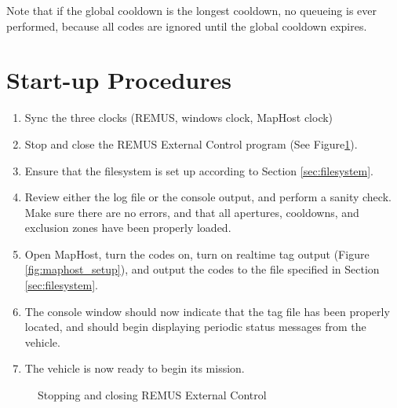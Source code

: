 \documentclass[11pt]{article} %
\begin{document}
Note that if the global cooldown is the longest cooldown, no queueing is ever performed, because all codes are ignored until the global cooldown
expires.


\section{Start-up Procedures}
\label{sec:startup}
\begin{enumerate}
\item Sync the three clocks (REMUS, windows clock, MapHost clock)
\item Stop and close the REMUS External Control program (See Figure\ref{fig:ext_control}).
\item Ensure that the filesystem is set up according to Section \ref{sec:filesystem}.
\item Review either the log file or the console output, and perform a sanity check. Make sure there are no errors, and that all apertures, cooldowns, and exclusion zones have been properly loaded.
\item Open MapHost, turn the codes on, turn on realtime tag output (Figure \ref{fig:maphost_setup}), and output the codes to the file specified in Section \ref{sec:filesystem}.
\item The console window should now indicate that the tag file has been properly located, and should begin displaying periodic status
	messages from the vehicle.
\item The vehicle is now ready to begin its mission.
\end{enumerate}


\begin{figure}[h]
\caption{Stopping and closing REMUS External Control}
\label{fig:ext_control}
\end{figure}
\end{document}
